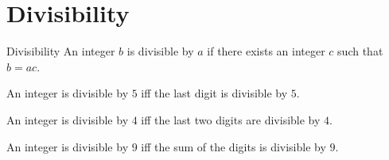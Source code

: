 \documentclass[professionalfont, 12pt, handout, t]{beamer} %
\theoremstyle{plain}
\theoremstyle{definition}
\begin{document}

\section{Divisibility}

\begin{frame}{Divisibility}
    An integer $b$ is divisible by $a$ if there exists an integer $c$ such that $b = ac$.\pause

    An integer is divisible by $5$ iff the last digit is divisible by $5$.\pause
    
    An integer is divisible by $4$ iff the last two digits are divisible by $4$.\pause

    An integer is divisible by $9$ iff the sum of the digits is divisible by $9$.
\end{frame}
\end{document}

